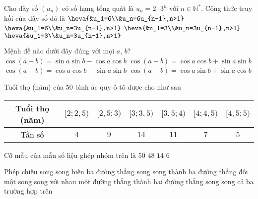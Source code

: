 \begin{ex}%
	Cho dãy số $\left(u_n\right)$ có số hạng tổng quát là $u_{n}=2\cdot3^n$ với $n\in\mathbb{N^*}$. Công thức truy hồi của dãy số đó là
	\choice
	{$\heva{&u_1=6\\&u_n=6u_{n-1},n>1}$}
	{\True $\heva{&u_1=6\\&u_n=3u_{n-1},n>1}$}
	{$\heva{&u_1=3\\&u_n=3u_{n-1},n>1}$}
	{$\heva{&u_1=3\\&u_n=3u_{n-1},n>1}$}
\end{ex}

\begin{ex}%
	Mệnh đề nào dưới đây đúng với mọi $a$, $b$?
	\choice
	{$\cos{\left(a - b \right)} = \sin{a} \sin{b} - \cos{a}\cos{b}$}
	{\True $\cos{\left(a - b \right)} = \cos{a}\cos{b} + \sin{a} \sin{b}$}
	{$\cos{\left(a - b \right)} = \cos{a}\cos{b} - \sin{a} \sin{b}$}
	{$\cos{\left(a - b \right)} = \cos{a}\sin{b} + \sin{a} \cos{b}$}
\end{ex}

\begin{ex}%
	Tuổi thọ (năm) của $50$ bình ác quy ô tô được cho như sau
	\begin{center}
		\begin{tabular}{|c|c|c|c|c|c|c|}
			\hline
			Tuổi thọ (năm) & $[2;2{,}5)$ & $[2{,}5;3)$ & $[3;3{,}5)$ & $[3{,}5;4)$ & $[4;4{,}5)$ & $[4{,}5;5)$ \\
			\hline
			Tần số         & $4$         & $9$         & $14$        & $11$        & $7$         & $5$         \\
			\hline
		\end{tabular}
	\end{center}
	Cỡ mẫu của mẫu số liệu ghép nhóm trên là
	\choice
	{\True $50$}
	{$48$}
	{$14$}
	{$6$}
\end{ex}

\begin{ex}%
	Phép chiếu song song biến ba đường thẳng song song thành
	\choice
	{ba đường thẳng đôi một song song với nhau}
	{một đường thẳng}
	{thành hai đường thẳng song song}
	{\True cả ba trường hợp trên}
\end{ex}


